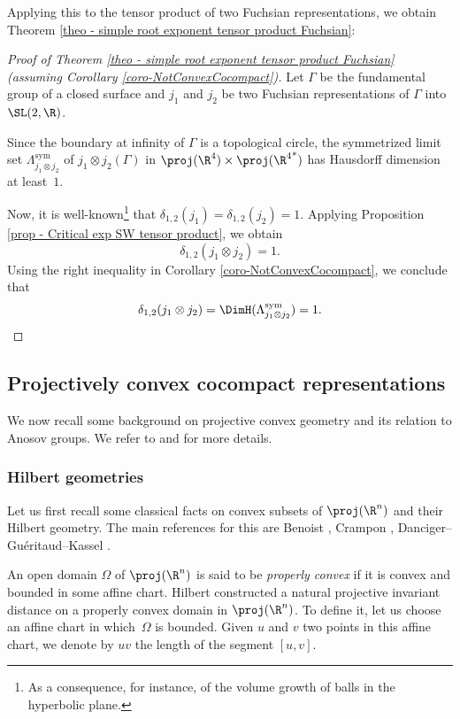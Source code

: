 Applying this to the tensor product of two Fuchsian representations, we obtain Theorem \ref{theo - simple root exponent tensor product Fuchsian}:

\begin{proof}[Proof of Theorem \ref{theo - simple root exponent tensor product Fuchsian} (assuming Corollary \ref{coro-NotConvexCocompact})]
Let $\Gamma$ be the fundamental group of a closed surface and $j_1$ and $j_2$ be two Fuchsian representations of $\Gamma$ into $\SL(2,\R)$.

Since the boundary at infinity of $\Gamma$ is a topological circle, the symmetrized limit set $\Lambda_{j_1\otimes j_2}^{\mathrm{sym}}$ of $j_1\otimes j_2(\Gamma)$ in $\proj(\R^4)\times \proj({\R^4}^*)$ has Hausdorff dimension at least~$1$.

Now, it is well-known\footnote{As a consequence, for instance, of the volume growth of balls in the hyperbolic plane.} that $\delta_{1,2}(j_1) = \delta_{1,2}(j_2) = 1$. Applying Proposition \ref{prop - Critical exp SW tensor product}, we obtain
\[\delta_{1,2}(j_1\otimes j_2) =1.\]
Using the right inequality in Corollary \ref{coro-NotConvexCocompact}, we conclude that
\[\delta_{1,2}(j_1\otimes j_2) = \DimH(\Lambda_{j_1\otimes j_2}^{\mathrm{sym}}) = 1.\qedhere\]
\end{proof}

\subsection{Projectively convex cocompact representations}\label{subsec - projectively cc representations}

We now recall some background on projective convex geometry and its relation to Anosov groups. We refer to \cite{DGK} and \cite{zimmer} for more details.

\subsubsection{Hilbert geometries}

Let us first recall some classical facts on convex subsets of $\proj(\R^n)$ and their Hilbert geometry. The main references for this are Benoist \cite{Benoist2001convexe}, Crampon \cite{crampon2009entropies,crampon2011dynamics}, Danciger--Guéritaud--Kassel \cite{DGK}.

An open domain $\Omega$ of $\proj(\R^n)$ is said to be \emph{properly convex} if it is convex and bounded in some affine chart. Hilbert constructed a natural projective invariant distance on a properly convex domain in $\proj(\R^n)$. To define it, let us choose an affine chart in which~$\Omega$ is bounded. Given $u$ and $v$ two points in this affine chart, we denote by $uv$ the length of the segment $[u,v]$.

